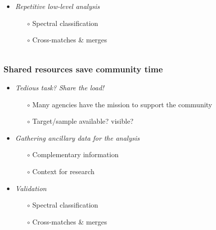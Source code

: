 \begin{frame}
\begin{columns}[T]
\begin{column}{.6\textwidth}
\begin{overlayarea}{\textwidth}{\textheight}
\begin{onlyenv}
\begin{itemize}[<.->]
            \vspace{0.5em}
            \item \emph{Repetitive low-level analysis}
              \begin{itemize}[<.->]
                \item[$\circ$] Spectral classification
                \item[$\circ$] Cross-matches \& merges
              \end{itemize}

          \end{itemize}
        \end{onlyenv}
      \end{overlayarea}
    \end{column}
  
  \end{columns}

\end{frame}



\begin{frame}
  \frametitle{Shared resources save community time}

  \begin{itemize}[<.->]
    \item \emph{Tedious task? Share the load!}
      \begin{itemize}[<.->]
        \item[$\circ$] Many agencies have the mission to support the community
        \item[$\circ$] Target/sample available? visible?
      \end{itemize}
  
    \vspace{0.5em}
    \item \emph{Gathering ancillary data for the analysis}
      \begin{itemize}[<.->]
        \item[$\circ$] Complementary information 
        \item[$\circ$] Context for research 
      \end{itemize}
  
    \vspace{0.5em}
    \item \emph{Validation}
      \begin{itemize}[<.->]
        \item[$\circ$] Spectral classification
        \item[$\circ$] Cross-matches \& merges
      \end{itemize}

  \end{itemize}
  
\end{frame}




